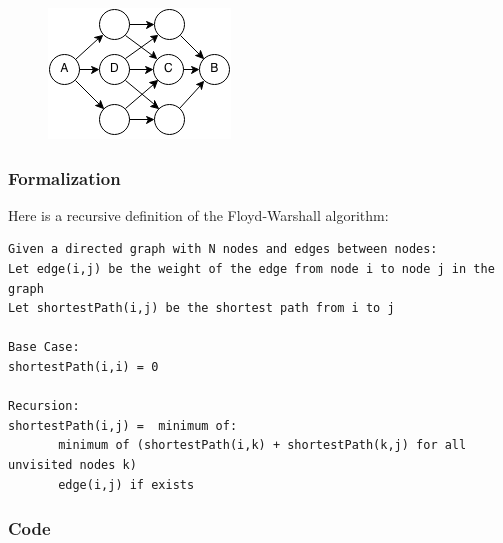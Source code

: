 \documentclass[11pt,oneside]{book}
\makeatletter
\def\maxwidth#1{\ifdim\Gin@nat@width>#1 #1\else\Gin@nat@width\fi}
\makeatother
\begin{document}
\vspace{5px}\begin{figure}[H]\centering
        \includegraphics[width=0.66\maxwidth{\textwidth}]{floydwarshall.png}
        \end{figure}

\subsubsection{Formalization}

Here is a recursive definition of the Floyd-Warshall algorithm:

\begin{lstlisting}
Given a directed graph with N nodes and edges between nodes:
Let edge(i,j) be the weight of the edge from node i to node j in the graph
Let shortestPath(i,j) be the shortest path from i to j

Base Case:
shortestPath(i,i) = 0

Recursion:
shortestPath(i,j) =  minimum of:
       minimum of (shortestPath(i,k) + shortestPath(k,j) for all unvisited nodes k)
       edge(i,j) if exists
\end{lstlisting}

\subsubsection{Code}
\end{document}
